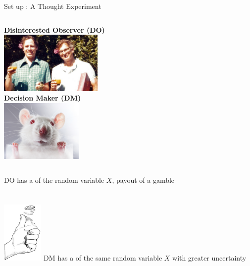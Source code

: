 \begin{frame}{Set up : A Thought Experiment}
\begin{columns}[T]
	\centering
	\textbf{Disinterested Observer (DO)} \\
	\vspace{0.5em}
	\includegraphics[height=3cm]{img/TverskyKahnemanFunny} \\
	\vspace{0.5em}
	\centering
	\textbf{Decision Maker (DM)} \\
	\vspace{0.5em}
	\includegraphics[height=3cm]{img/LabRat} \\
	\vspace{0.5em}
\end{columns}

\begin{columns}[T]
	\vspace{0.5em}
	DO has a  of the random variable $X$, \eg payout of a gamble \\
	 \\
  \\
\centering
	\includegraphics[height=3cm]{img/coinflip}
	\vspace{0.5em}
  DM has a  of the same random variable $X$ with greater uncertainty\\
    \\
\end{columns}
\end{frame}


